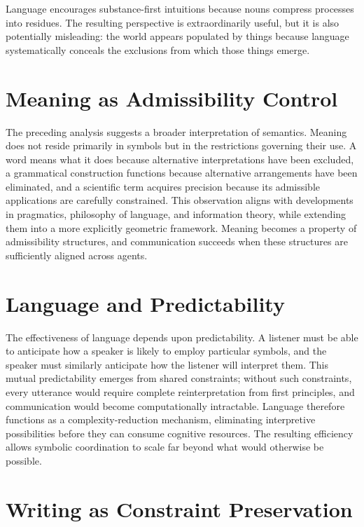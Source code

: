 \documentclass[11pt,oneside]{book}
\theoremstyle{plain}
\theoremstyle{definition}
\theoremstyle{remark}
\begin{document}
Language encourages substance-first intuitions because nouns compress processes into residues. The resulting perspective is extraordinarily useful, but it is also potentially misleading: the world appears populated by things because language systematically conceals the exclusions from which those things emerge.

\section{Meaning as Admissibility Control}

The preceding analysis suggests a broader interpretation of semantics. Meaning does not reside primarily in symbols but in the restrictions governing their use. A word means what it does because alternative interpretations have been excluded, a grammatical construction functions because alternative arrangements have been eliminated, and a scientific term acquires precision because its admissible applications are carefully constrained. This observation aligns with developments in pragmatics, philosophy of language, and information theory, while extending them into a more explicitly geometric framework. Meaning becomes a property of admissibility structures, and communication succeeds when these structures are sufficiently aligned across agents.

\section{Language and Predictability}

The effectiveness of language depends upon predictability. A listener must be able to anticipate how a speaker is likely to employ particular symbols, and the speaker must similarly anticipate how the listener will interpret them. This mutual predictability emerges from shared constraints; without such constraints, every utterance would require complete reinterpretation from first principles, and communication would become computationally intractable. Language therefore functions as a complexity-reduction mechanism, eliminating interpretive possibilities before they can consume cognitive resources. The resulting efficiency allows symbolic coordination to scale far beyond what would otherwise be possible.

\section{Writing as Constraint Preservation}
\end{document}
